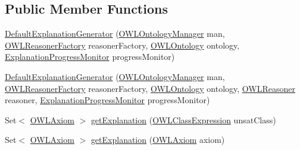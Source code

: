 \subsection*{Public Member Functions}
\begin{DoxyCompactItemize}
\item 
\hyperlink{classcom_1_1clarkparsia_1_1owlapi_1_1explanation_1_1_default_explanation_generator_aaa112017a279fbc8d5243f88ac4838f5}{Default\-Explanation\-Generator} (\hyperlink{interfaceorg_1_1semanticweb_1_1owlapi_1_1model_1_1_o_w_l_ontology_manager}{O\-W\-L\-Ontology\-Manager} man, \hyperlink{interfaceorg_1_1semanticweb_1_1owlapi_1_1reasoner_1_1_o_w_l_reasoner_factory}{O\-W\-L\-Reasoner\-Factory} reasoner\-Factory, \hyperlink{interfaceorg_1_1semanticweb_1_1owlapi_1_1model_1_1_o_w_l_ontology}{O\-W\-L\-Ontology} ontology, \hyperlink{interfacecom_1_1clarkparsia_1_1owlapi_1_1explanation_1_1util_1_1_explanation_progress_monitor}{Explanation\-Progress\-Monitor} progress\-Monitor)
\item 
\hyperlink{classcom_1_1clarkparsia_1_1owlapi_1_1explanation_1_1_default_explanation_generator_a0b50dfbeb94c28b3c457e9ecdabc1377}{Default\-Explanation\-Generator} (\hyperlink{interfaceorg_1_1semanticweb_1_1owlapi_1_1model_1_1_o_w_l_ontology_manager}{O\-W\-L\-Ontology\-Manager} man, \hyperlink{interfaceorg_1_1semanticweb_1_1owlapi_1_1reasoner_1_1_o_w_l_reasoner_factory}{O\-W\-L\-Reasoner\-Factory} reasoner\-Factory, \hyperlink{interfaceorg_1_1semanticweb_1_1owlapi_1_1model_1_1_o_w_l_ontology}{O\-W\-L\-Ontology} ontology, \hyperlink{interfaceorg_1_1semanticweb_1_1owlapi_1_1reasoner_1_1_o_w_l_reasoner}{O\-W\-L\-Reasoner} reasoner, \hyperlink{interfacecom_1_1clarkparsia_1_1owlapi_1_1explanation_1_1util_1_1_explanation_progress_monitor}{Explanation\-Progress\-Monitor} progress\-Monitor)
\item 
Set$<$ \hyperlink{interfaceorg_1_1semanticweb_1_1owlapi_1_1model_1_1_o_w_l_axiom}{O\-W\-L\-Axiom} $>$ \hyperlink{classcom_1_1clarkparsia_1_1owlapi_1_1explanation_1_1_default_explanation_generator_af677307d097542595e192a68da59a2db}{get\-Explanation} (\hyperlink{interfaceorg_1_1semanticweb_1_1owlapi_1_1model_1_1_o_w_l_class_expression}{O\-W\-L\-Class\-Expression} unsat\-Class)
\item 
Set$<$ \hyperlink{interfaceorg_1_1semanticweb_1_1owlapi_1_1model_1_1_o_w_l_axiom}{O\-W\-L\-Axiom} $>$ \hyperlink{classcom_1_1clarkparsia_1_1owlapi_1_1explanation_1_1_default_explanation_generator_afae13627ccec87cf91d8ef1c02560cb9}{get\-Explanation} (\hyperlink{interfaceorg_1_1semanticweb_1_1owlapi_1_1model_1_1_o_w_l_axiom}{O\-W\-L\-Axiom} axiom)

\end{DoxyCompactItemize}

